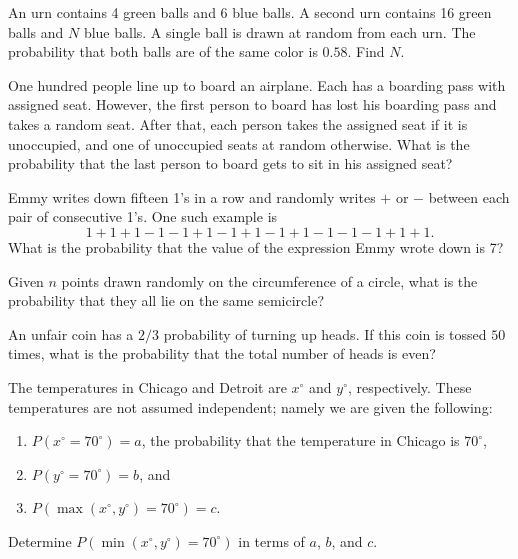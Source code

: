 \documentclass[12pt]{article}
\begin{document}
    \begin{exercise}
        An urn contains 4 green balls and 6 blue balls.
        A second urn contains 16 green balls and \(N\) blue balls.
        A single ball is drawn at random from each urn.
        The probability that both balls are of the same color is \(0.58\).
        Find \(N\).
    \end{exercise}

    \begin{exercise}
        One hundred people line up to board an airplane. 
        Each has a boarding pass with assigned seat. 
        However, the first person to board has lost his boarding pass and takes a random seat. 
        After that, each person takes the assigned seat if it is unoccupied, and one of unoccupied seats at random otherwise. 
        What is the probability that the last person to board gets to sit in his assigned seat?
    \end{exercise}

    \begin{exercise}
        Emmy writes down fifteen 1's in a row and randomly writes \(+\) or \(-\) between each pair of consecutive 1's.
        One such example is
        \[1+1+1-1-1+1-1+1-1+1-1-1-1+1+1.\]
        What is the probability that the value of the expression Emmy wrote down is 7?
    \end{exercise}
    
    \begin{exercise}
        Given \(n\) points drawn randomly on the circumference of a circle, what is the probability that they all lie on the same semicircle?
    \end{exercise}

    \begin{exercise}
        An unfair coin has a \(2/3\) probability of turning up heads. If this coin is tossed \(50\) times, what is the probability that the total number of heads is even?
    \end{exercise}

    \begin{exercise}
        The temperatures in Chicago and Detroit are \(x^\circ\) and \(y^\circ\), respectively.
        These temperatures are not assumed independent; namely we are given the following:
        \begin{enumerate}
            \item \(P(x^\circ=70^\circ)=a\), the probability that the temperature in Chicago is \(70^\circ\),
            \item \(P(y^\circ=70^\circ)=b\), and
            \item \(P(\max(x^\circ,y^\circ)=70^\circ)=c\).
        \end{enumerate}
        Determine \(P(\min(x^\circ,y^\circ)=70^\circ)\) in terms of \(a\), \(b\), and \(c\).
    \end{exercise}
\end{document}
